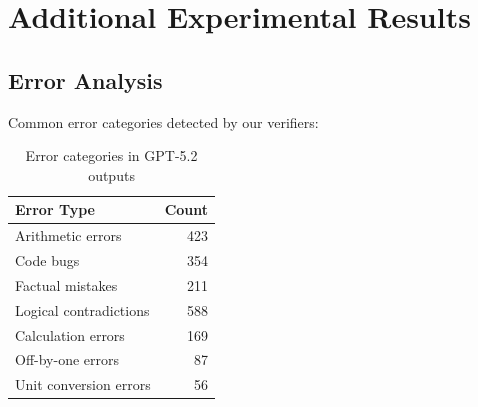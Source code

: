\documentclass[11pt,a4paper]{article}
\begin{document}
\section{Additional Experimental Results}
\label{app:results}

\subsection{Error Analysis}

Common error categories detected by our verifiers:

\begin{table}[h]
\centering
\caption{Error categories in GPT-5.2 outputs}
\begin{tabular}{lr}
\toprule
\textbf{Error Type} & \textbf{Count} \\
\midrule
Arithmetic errors & 423 \\
Code bugs & 354 \\
Factual mistakes & 211 \\
Logical contradictions & 588 \\
Calculation errors & 169 \\
Off-by-one errors & 87 \\
Unit conversion errors & 56 \\
\bottomrule
\end{tabular}
\end{table}
\end{document}
